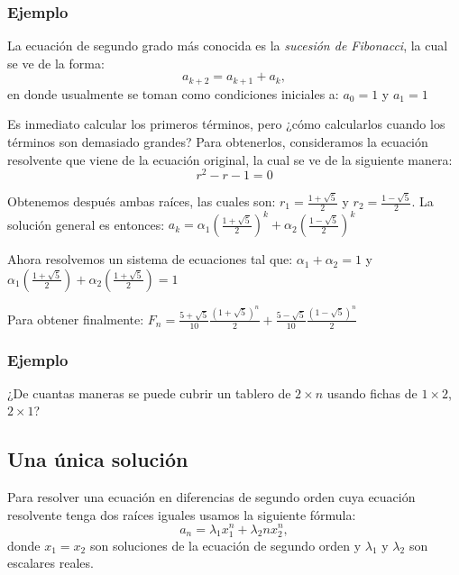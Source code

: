 \documentclass{article}
\begin{document}

\subsubsection{Ejemplo}

La ecuación de segundo grado más conocida es la \textit{sucesión de
  Fibonacci}, la cual se ve de la forma:
$$a_{k+2}=a_{k+1}+a_{k},$$
en donde usualmente se toman como condiciones iniciales a: $a_{0}=1$ y $a_{1}=1$

Es inmediato calcular los primeros términos, pero ¿cómo calcularlos
cuando los términos son demasiado grandes?  Para obtenerlos,
consideramos la ecuación resolvente que viene de la ecuación original,
la cual se ve de la siguiente manera:
$$r^2-r-1=0$$

Obtenemos después ambas raíces, las cuales son:
$r_{1}= \frac{1+\sqrt{5}}{2}$ y $r_{2}=\frac{1-\sqrt{5}}{2}$. La
solución general es entonces:
$a_{k}=\alpha_{1}(\frac{1+\sqrt{5}}{2})^{k} +
\alpha_{2}(\frac{1-\sqrt{5}}{2})^k$

Ahora resolvemos un sistema de ecuaciones tal que:
$\alpha_{1} + \alpha_{2}= 1$ y
$\alpha_{1}(\frac{1+\sqrt{5}}{2}) + \alpha_{2}(\frac{1+\sqrt{5}}{2})=1$

Para obtener finalmente:
$F_{n}= \frac{5+\sqrt{5}}{10}\frac{(1+\sqrt{5})^n}{2} +
\frac{5-\sqrt{5}}{10}\frac{(1-\sqrt{5})^n}{2}$

\subsubsection{Ejemplo}
\label{sec:fichas}

¿De cuantas maneras se puede cubrir un tablero de $2\times n$ usando
fichas de $1\times 2$, $2\times 1$?



\subsection{Una única solución}
\label{sec:unica}

Para resolver una ecuación en diferencias de segundo orden cuya
ecuación resolvente tenga dos raíces iguales usamos la siguiente fórmula:
\begin{equation}
 \label{raicesiguales}
 a_n=\lambda_1x_1^n +\lambda_2nx_2^n,
\end{equation}
donde $x_1=x_2$ son soluciones de la ecuación de segundo orden y
$\lambda_1$ y $\lambda_2$ son escalares reales.
\end{document}
